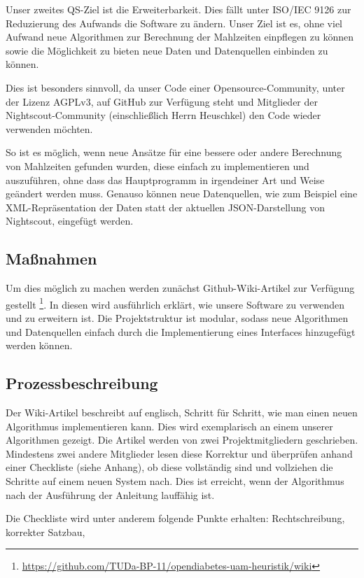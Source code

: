 \documentclass[accentcolor=tud0b,12pt,paper=a4]{tudreport}
\begin{document}
Unser zweites QS-Ziel ist die Erweiterbarkeit. Dies fällt unter ISO/IEC 9126 zur Reduzierung des Aufwands die Software zu ändern. Unser Ziel ist es, ohne viel Aufwand neue Algorithmen zur Berechnung der Mahlzeiten einpflegen zu können sowie die Möglichkeit zu bieten neue Daten und Datenquellen einbinden zu können.

Dies ist besonders sinnvoll, da unser Code einer Opensource-Community, unter der Lizenz AGPLv3, auf GitHub zur Verfügung steht und Mitglieder der Nightscout-Community (einschließlich Herrn Heuschkel) den Code wieder verwenden möchten.

So ist es möglich, wenn neue Ansätze für eine bessere oder andere Berechnung von Mahlzeiten gefunden wurden, diese einfach zu implementieren und auszuführen, ohne dass das Hauptprogramm in irgendeiner Art und Weise geändert werden muss. Genauso können neue Datenquellen, wie zum Beispiel eine XML-Repräsentation der Daten statt der aktuellen JSON-Darstellung von Nightscout, eingefügt werden.

\subsection{Maßnahmen}

Um dies möglich zu machen werden zunächst Github-Wiki-Artikel zur Verfügung gestellt \footnote{\url{https://github.com/TUDa-BP-11/opendiabetes-uam-heuristik/wiki}}. In diesen wird ausführlich erklärt, wie unsere Software zu verwenden und zu erweitern ist. Die Projektstruktur ist modular, sodass neue Algorithmen und Datenquellen einfach durch die Implementierung eines Interfaces hinzugefügt werden können. 

\subsection{Prozessbeschreibung}

Der Wiki-Artikel beschreibt auf englisch, Schritt für Schritt, wie man einen neuen Algorithmus implementieren kann. Dies wird exemplarisch an einem unserer Algorithmen gezeigt. Die Artikel werden von zwei Projektmitgliedern geschrieben. Mindestens zwei andere Mitglieder lesen diese Korrektur und überprüfen anhand einer Checkliste (siehe Anhang), ob diese vollständig sind und vollziehen die Schritte auf einem neuen System nach. Dies ist erreicht, wenn der Algorithmus nach der Ausführung der Anleitung lauffähig ist.

Die Checkliste wird unter anderem folgende Punkte erhalten: Rechtschreibung, korrekter Satzbau, 
\end{document}
